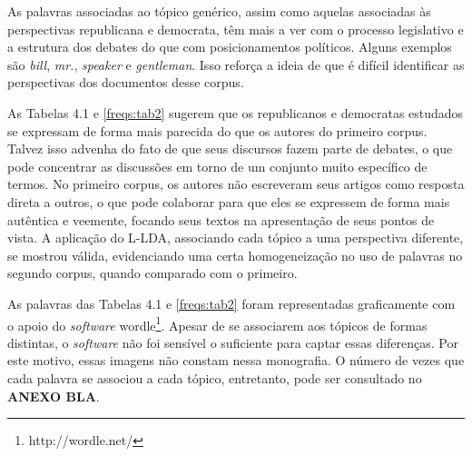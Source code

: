 As palavras associadas ao tópico genérico, assim como aquelas associadas às perspectivas republicana e democrata, têm mais a ver com o processo legislativo e a estrutura dos debates do que com posicionamentos políticos. Alguns exemplos são \emph{bill}, \emph{mr.}, \emph{speaker} e \emph{gentleman}. Isso reforça a ideia de que é difícil identificar as perspectivas dos documentos desse corpus. %

As Tabelas 4.1 e \ref{freqs:tab2} sugerem que os republicanos e democratas estudados se expressam de forma mais parecida do que os autores do primeiro corpus. Talvez isso advenha do fato de que seus discursos fazem parte de debates, o que pode concentrar as discussões em torno de um conjunto muito específico de termos. No primeiro corpus, os autores não escreveram seus artigos como resposta direta a outros, o que pode colaborar para que eles se expressem de forma mais autêntica e veemente, focando seus textos na apresentação de seus pontos de vista. A aplicação do L-LDA, associando cada tópico a uma perspectiva diferente, se mostrou válida, evidenciando uma certa homogeneização no uso de palavras no segundo corpus, quando comparado com o primeiro.

As palavras das Tabelas 4.1 e \ref{freqs:tab2} foram representadas graficamente com o apoio do \emph{software} wordle\footnote{http://wordle.net/}. Apesar de se associarem aos tópicos de formas distintas, o \emph{software} não foi sensível o suficiente para captar essas diferenças. Por este motivo, essas imagens não constam nessa monografia. O número de vezes que cada palavra se associou a cada tópico, entretanto, pode ser consultado no \textbf{ANEXO BLA}. %



